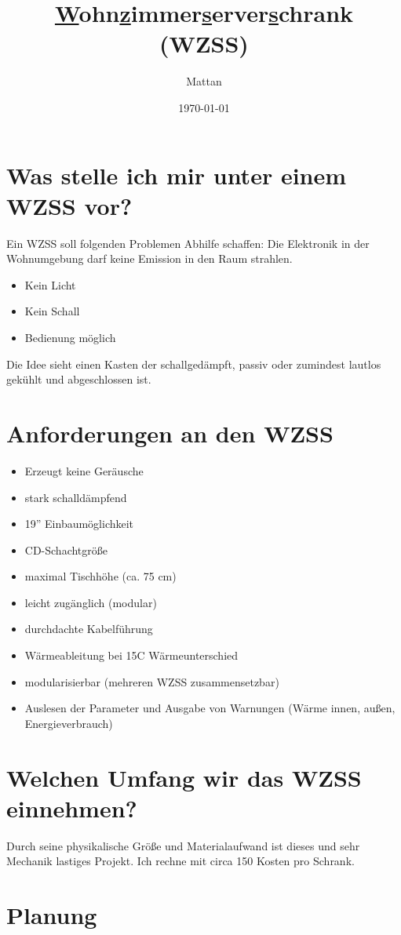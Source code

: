 \documentclass[10pt,a4paper]{article}%
\date{\today}
\author{Mattan}
\title{\underline{W}ohn\underline{z}immer\underline{s}erver\underline{s}chrank (WZSS)}
\def\inch#1{#1''}
\begin{document}
\maketitle

\section{Was stelle ich mir unter einem WZSS vor?}
Ein WZSS soll folgenden Problemen Abhilfe schaffen:
Die Elektronik in der Wohnumgebung darf keine Emission in den Raum strahlen. 
\begin{itemize}
\item Kein Licht
\item Kein Schall
\item Bedienung möglich
\end{itemize}
Die Idee sieht einen Kasten der schallgedämpft, passiv oder zumindest lautlos gekühlt und abgeschlossen ist.


\section{Anforderungen an den WZSS}

\begin{itemize}
		\item Erzeugt keine Geräusche
		\item stark schalldämpfend
		\item \inch{19} Einbaumöglichkeit
		\item CD-Schachtgröße 
		\item maximal Tischhöhe (ca. 75 cm)
		\item leicht zugänglich (modular)
		\item durchdachte Kabelführung
		\item Wärmeableitung bei 15\degree C Wärmeunterschied
		\item modularisierbar (mehreren WZSS zusammensetzbar)
		\item Auslesen der Parameter und Ausgabe von Warnungen (Wärme innen, außen, Energieverbrauch)
\end{itemize}
\section{Welchen Umfang wir das WZSS einnehmen?}
Durch seine physikalische Größe und Materialaufwand ist dieses und sehr Mechanik lastiges Projekt.
Ich rechne mit circa 150 \texteuro Kosten pro Schrank. 
\section{Planung}
\end{document}
